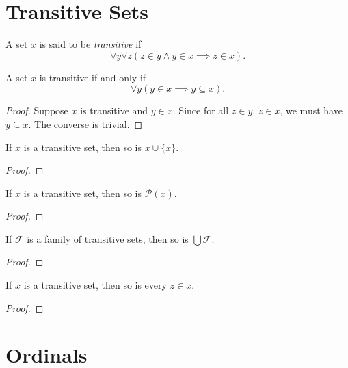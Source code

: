 \section{Transitive Sets}

\begin{definition}
    A set $x$ is said to be \emph{transitive} if 
    \begin{equation*}
        \forall y\forall z(z\in y\wedge y\in x\implies z\in x).
    \end{equation*}
\end{definition}

\begin{proposition}
    A set $x$ is transitive if and only if 
    \begin{equation*}
        \forall y(y\in x\implies y\subseteq x).
    \end{equation*}
\end{proposition}
\begin{proof}
    Suppose $x$ is transitive and $y\in x$. Since for all $z\in y$, $z\in x$, we must have $y\subseteq x$. The converse is trivial.
\end{proof}

\begin{proposition}
    If $x$ is a transitive set, then so is $x\cup\{x\}$.
\end{proposition}
\begin{proof}
\end{proof}

\begin{proposition}
    If $x$ is a transitive set, then so is $\mathscr P(x)$.
\end{proposition}
\begin{proof}
\end{proof}

\begin{proposition}
    If $\mathscr F$ is a family of transitive sets, then so is $\bigcup\mathscr F$.
\end{proposition}
\begin{proof}
\end{proof}

\begin{proposition}
    If $x$ is a transitive set, then so is every $z\in x$.
\end{proposition}
\begin{proof}
\end{proof}

\section{Ordinals}

